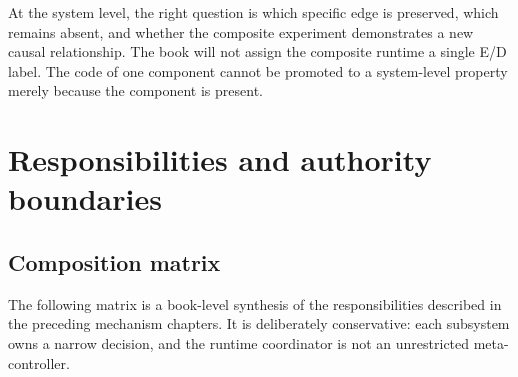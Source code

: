 At the system level, the right question is which specific edge is preserved, which remains absent, and whether the composite experiment demonstrates a new causal relationship. The book will not assign the composite runtime a single E/D label. The code of one component cannot be promoted to a system-level property merely because the component is present.

\section{Responsibilities and authority boundaries}
\label{sec:ch18-authority-boundaries}

\subsection{Composition matrix}
\label{subsec:ch18-composition-matrix}

The following matrix is a book-level synthesis of the responsibilities described in the preceding mechanism chapters. It is deliberately conservative: each subsystem owns a narrow decision, and the runtime coordinator is not an unrestricted meta-controller.

